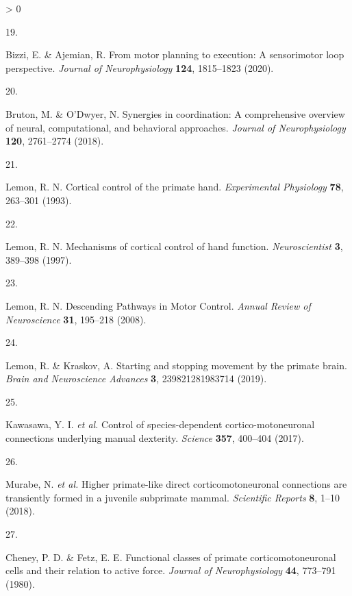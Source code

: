 \documentclass[
  a4paper,
]{article}
\newlength{\cslhangindent}
\newlength{\csllabelwidth}
\newenvironment{CSLReferences}[2] %
 {%
  \setlength{\parindent}{0pt}
  \ifodd #1 \everypar{\setlength{\hangindent}{\cslhangindent}}\ignorespaces\fi
  \ifnum #2 > 0
  \setlength{\parskip}{#2\baselineskip}
  \fi
 }%
 {}
\newcommand{\CSLLeftMargin}[1]{\parbox[t]{\csllabelwidth}{#1}}
\newcommand{\CSLRightInline}[1]{\parbox[t]{\linewidth - \csllabelwidth}{#1}\break}
\begin{document}
\begin{CSLReferences}{0}{0}
\leavevmode\hypertarget{ref-bizziMotorPlanningExecution2020}{}%
\CSLLeftMargin{19. }
\CSLRightInline{Bizzi, E. \& Ajemian, R. From motor planning to
execution: A sensorimotor loop perspective. \emph{Journal of
Neurophysiology} \textbf{124}, 1815--1823 (2020).}

\leavevmode\hypertarget{ref-brutonSynergiesCoordinationComprehensive2018}{}%
\CSLLeftMargin{20. }
\CSLRightInline{Bruton, M. \& O'Dwyer, N. Synergies in coordination: A
comprehensive overview of neural, computational, and behavioral
approaches. \emph{Journal of Neurophysiology} \textbf{120}, 2761--2774
(2018).}

\leavevmode\hypertarget{ref-lemon1993}{}%
\CSLLeftMargin{21. }
\CSLRightInline{Lemon, R. N. Cortical control of the primate hand.
\emph{Experimental Physiology} \textbf{78}, 263--301 (1993).}

\leavevmode\hypertarget{ref-lemon1997}{}%
\CSLLeftMargin{22. }
\CSLRightInline{Lemon, R. N. Mechanisms of cortical control of hand
function. \emph{Neuroscientist} \textbf{3}, 389--398 (1997).}

\leavevmode\hypertarget{ref-lemon2008}{}%
\CSLLeftMargin{23. }
\CSLRightInline{Lemon, R. N. Descending {Pathways} in {Motor Control}.
\emph{Annual Review of Neuroscience} \textbf{31}, 195--218 (2008).}

\leavevmode\hypertarget{ref-lemonStartingStoppingMovement2019}{}%
\CSLLeftMargin{24. }
\CSLRightInline{Lemon, R. \& Kraskov, A. Starting and stopping movement
by the primate brain. \emph{Brain and Neuroscience Advances} \textbf{3},
239821281983714 (2019).}

\leavevmode\hypertarget{ref-kawasawa2017}{}%
\CSLLeftMargin{25. }
\CSLRightInline{Kawasawa, Y. I. \emph{et al.} Control of
species-dependent cortico-motoneuronal connections underlying manual
dexterity. \emph{Science} \textbf{357}, 400--404 (2017).}

\leavevmode\hypertarget{ref-murabe2018}{}%
\CSLLeftMargin{26. }
\CSLRightInline{Murabe, N. \emph{et al.} Higher primate-like direct
corticomotoneuronal connections are transiently formed in a juvenile
subprimate mammal. \emph{Scientific Reports} \textbf{8}, 1--10 (2018).}

\leavevmode\hypertarget{ref-cheneyFunctionalClassesPrimate1980}{}%
\CSLLeftMargin{27. }
\CSLRightInline{Cheney, P. D. \& Fetz, E. E. Functional classes of
primate corticomotoneuronal cells and their relation to active force.
\emph{Journal of Neurophysiology} \textbf{44}, 773--791 (1980).}


\end{CSLReferences}
\end{document}
